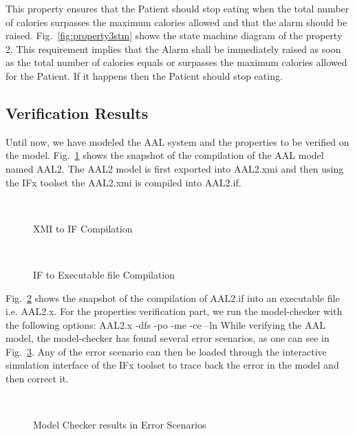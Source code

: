 \documentclass[a4paper,twoside]{article}
\begin{document}
This property ensures that the Patient should stop eating when the total number of calories surpasses the maximum calories allowed and that the alarm should be raised.
Fig.~\ref{fig:property3stm} shows the state machine diagram of the property 2. This requirement implies that the Alarm shall be immediately raised as soon as the total number of calories equals or surpasses the maximum calories allowed for the Patient. If it happens then the Patient should stop eating.  

\subsection{Verification Results}
Until now, we have modeled the AAL system and the properties to be verified on the model. Fig.~\ref{fig:xmi2if} shows the snapshot of the compilation of the AAL model named AAL2. The AAL2 model is first exported into AAL2.xmi and then using the IFx toolset the AAL2.xmi is compiled into AAL2.if.

\begin{figure}[!h]
  \vspace{8cm}~
  \centering
  {}
  \caption{XMI to IF Compilation}
  \label{fig:xmi2if}
 \end{figure}
 
\begin{figure}[!h]
  \vspace{8cm}~
  \centering
  {}
  \caption{IF to Executable file Compilation}
  \label{fig:if2exe}
 \end{figure}

Fig.~\ref{fig:if2exe} shows the snapshot of the compilation of AAL2.if into an executable file i.e. AAL2.x. 
For the properties verification part, we run the model-checker with the following options:
AAL2.x -dfs -po -me -ce –ln
While verifying the AAL model, the model-checker has found several error scenarios, as one can see in Fig.~\ref{fig:errorstate}.  Any of the error scenario can then be loaded through the interactive simulation interface of the IFx toolset to trace back the error in the model and then correct it. 


\begin{figure}[!h]
  \vspace{8cm}~
  \centering
  {}
  \caption{Model Checker results in Error Scenarios}
  \label{fig:errorstate}
 \end{figure}
\end{document}
